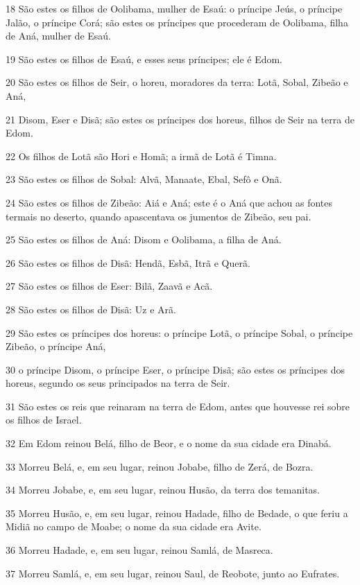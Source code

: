 \par 18 São estes os filhos de Oolibama, mulher de Esaú: o príncipe Jeús, o príncipe Jalão, o príncipe Corá; são estes os príncipes que procederam de Oolibama, filha de Aná, mulher de Esaú.
\par 19 São estes os filhos de Esaú, e esses seus príncipes; ele é Edom.
\par 20 São estes os filhos de Seir, o horeu, moradores da terra: Lotã, Sobal, Zibeão e Aná,
\par 21 Disom, Eser e Disã; são estes os príncipes dos horeus, filhos de Seir na terra de Edom.
\par 22 Os filhos de Lotã são Hori e Homã; a irmã de Lotã é Timna.
\par 23 São estes os filhos de Sobal: Alvã, Manaate, Ebal, Sefô e Onã.
\par 24 São estes os filhos de Zibeão: Aiá e Aná; este é o Aná que achou as fontes termais no deserto, quando apascentava os jumentos de Zibeão, seu pai.
\par 25 São estes os filhos de Aná: Disom e Oolibama, a filha de Aná.
\par 26 São estes os filhos de Disã: Hendã, Esbã, Itrã e Querã.
\par 27 São estes os filhos de Eser: Bilã, Zaavã e Acã.
\par 28 São estes os filhos de Disã: Uz e Arã.
\par 29 São estes os príncipes dos horeus: o príncipe Lotã, o príncipe Sobal, o príncipe Zibeão, o príncipe Aná,
\par 30 o príncipe Disom, o príncipe Eser, o príncipe Disã; são estes os príncipes dos horeus, segundo os seus principados na terra de Seir.
\par 31 São estes os reis que reinaram na terra de Edom, antes que houvesse rei sobre os filhos de Israel.
\par 32 Em Edom reinou Belá, filho de Beor, e o nome da sua cidade era Dinabá.
\par 33 Morreu Belá, e, em seu lugar, reinou Jobabe, filho de Zerá, de Bozra.
\par 34 Morreu Jobabe, e, em seu lugar, reinou Husão, da terra dos temanitas.
\par 35 Morreu Husão, e, em seu lugar, reinou Hadade, filho de Bedade, o que feriu a Midiã no campo de Moabe; o nome da sua cidade era Avite.
\par 36 Morreu Hadade, e, em seu lugar, reinou Samlá, de Masreca.
\par 37 Morreu Samlá, e, em seu lugar, reinou Saul, de Reobote, junto ao Eufrates.
